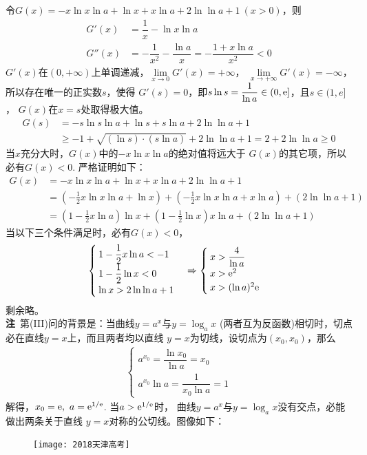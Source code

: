 \begin{enumerate}[label={【\textbf{例\thechapter.\arabic*}】},
 leftmargin=\inteval{\myenumleftmargin}pt,
 itemsep=\inteval{\myenumitempsep}pt,
 itemindent=\inteval{\myenumitemindent}pt]
令$ G(x)=-x\ln x\ln a+\ln x +x\ln a+2\ln\ln a+1\ (x>0) $，则
\begin{align*}
    G'(x)&=\dfrac{1}{x}-\ln x\ln a \\
    G''(x)&=-\dfrac{1}{x^2}-\dfrac{\ln a}{x}=-\dfrac{1+x\ln a}{x^2}<0
\end{align*}
$ G'(x) $在$ (0,+\infty) $上单调递减，$ \lim\limits_{x\to 0}G'(x)= +\infty $，
$ \lim\limits_{x\to +\infty}G'(x)= -\infty $，所以存在唯一的正实数$ s $，使得
$ G'(s)=0 $，即$ s\ln s=\dfrac{1}{\ln a}\in(0,\mathrm{e}] $，且$ s\in (1,e] $，
$ G(x) $在$ x=s $处取得极大值。
\begin{align*}
    G(s)&=-s\ln s\ln a+\ln s +s\ln a+2\ln\ln a+1 \\
    &\geq -1+\sqrt{(\ln s)\cdot (s\ln a)}+2\ln\ln a+1=2+2\ln\ln a\geq 0
\end{align*}
当$ x $充分大时，$ G(x) $中的$ -x\ln x\ln a $的绝对值将远大于
$ G(x) $的其它项，所以必有$ G(x)<0 $. 严格证明如下：
\begin{align*}
    G(x) &= -x\ln x\ln a+\ln x +x\ln a+2\ln\ln a+1 \\
    &=\left(-\frac{1}{2}x\ln x\ln a+\ln x\right)+
    \left(-\frac{1}{2}x\ln x\ln a+x\ln a\right)+(2\ln\ln a+1) \\
    &=\left(1-\frac{1}{2}x\ln a\right)\ln x+
    \left(1-\frac{1}{2}\ln x\right)x\ln a+(2\ln\ln a+1) 
\end{align*}
当以下三个条件满足时，必有$ G(x)<0 $，
\begin{gather*}
    \begin{cases}
        1-\dfrac{1}{2}x\ln a < -1 \\
        1-\dfrac{1}{2}\ln x <0 \\
        \ln x>2\ln\ln a+1
    \end{cases} \Rightarrow 
    \begin{cases}
        x> \dfrac{4}{\ln a} \\
        x>\mathrm{e}^2 \\
        x>(\ln a)^2\mathrm{e}
    \end{cases}
\end{gather*}
剩余略。\\
\textbf{注}\ 第(III)问的背景是：当曲线$ y=a^x $与$ y=\log_a x $
(两者互为反函数)相切时，切点必在直线$ y=x $上，而且两者均以直线
$ y=x $为切线，设切点为$ (x_0,x_0) $，那么
\begin{align*}
    \begin{cases}
        a^{x_0}=\dfrac{\ln x_0}{\ln a}=x_0 \\
        a^{x_0}\ln a=\dfrac{1}{x_0\ln a}=1
    \end{cases}
\end{align*}
解得，$ x_0=\mathrm{e},\ a=\mathrm{e}^{1/\mathrm{e}} $. 当$ a>\mathrm{e}^{1/\mathrm{e}} $时，
曲线$ y=a^x $与$ y=\log_a x $没有交点，必能做出两条关于直线
$ y=x $对称的公切线。图像如下：
\begin{figure}[H]
    \centering
    \texttt{[image: 2018天津高考]}
\end{figure}


\end{enumerate}
